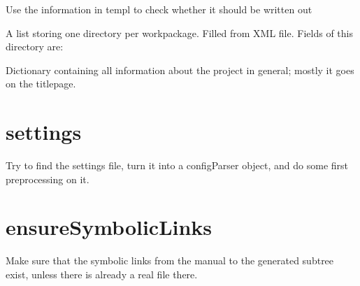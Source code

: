 \documentclass[a4paper,10pt,english]{sphinxmanual}
\begin{document}

\begin{fulllineitems}
\label{sourcecodedoc:latexFromXML.writeTemplateResult}
Use the information in templ to check whether it should be written out

\end{fulllineitems}


\begin{fulllineitems}
\label{sourcecodedoc:latexFromXML.allWPDicts}
A list storing one directory per workpackage. Filled from XML file. Fields of this directory are:

\end{fulllineitems}


\begin{fulllineitems}
\label{sourcecodedoc:latexFromXML.titlepageDict}
Dictionary containing all information about the project in general; mostly it goes on the titlepage.

\end{fulllineitems}



\section{settings}
\label{sourcecodedoc:module-settings}\label{sourcecodedoc:settings}

\begin{fulllineitems}
\label{sourcecodedoc:settings.getSettings}
Try to find the settings file, turn it into a configParser
object, and do some first preprocessing on it.

\end{fulllineitems}



\section{ensureSymbolicLinks}
\label{sourcecodedoc:ensuresymboliclinks}\label{sourcecodedoc:module-ensureSymbolicLinks}
Make sure that the symbolic links from the manual to the generated
subtree exist, unless there is already a real file there.
\end{document}
